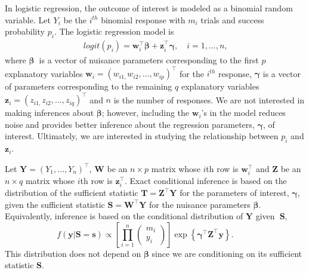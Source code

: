 \documentclass[article, shortnames]{jss}
\begin{document}
In logistic regression, the outcome of interest is modeled as a
binomial random variable. Let $Y_{i}$ be the $i^{th}$ binomial response
with $m_i$ trials and success probability $p_i$. The logistic regression
model is
\begin{equation*}
\begin{array}{l}
logit\left(
p_{i}\right) =\mathbf{w}_{i}^\top\mathbf{\beta +z}_{i}^\top\mathbf{\gamma }%
,\quad i=1,\ldots ,n\text{,}%
\end{array}%
\end{equation*}%
where $\mathbf{\beta }$\textbf{\ }is a vector of nuisance parameters
corresponding to the first $p$ explanatory variables
$\mathbf{w}_i=\left( w_{i1,}w_{i2},\ldots ,w_{ip}\right)^\top$
for the $i^{th}$ response,
$\mathbf{\gamma }$ is a vector of parameters corresponding to the
remaining $q$ explanatory variables $\mathbf{z}_i=\left(
z_{i1,}z_{i2},\ldots ,z_{iq}\right)^\top$ and $n$ is the number of
responses. We are not
interested in making inferences about $\mathbf{\beta }$; however,
including the $\mathbf{w}_{i}$'s in the model reduces noise and
provides better inference about the regression parameters,
$\mathbf{\gamma }$, of interest.
Ultimately, we are interested in
studying the relationship between $p_i$ and $\mathbf{z}_i$.

Let $\mathbf{Y}=(Y_1,\ldots,Y_n)^\top$,
$\mathbf{W}$ be an $n\times p$ matrix whose $i$th row is
$\mathbf{w}^\top_i$ and
$\mathbf{Z}$ be an $n\times q$ matrix whose $i$th row is
$\mathbf{z}^\top_i$.
Exact conditional inference is based on the distribution of the sufficient
statistic $\mathbf{T}=\mathbf{Z}^\top \mathbf{Y}$
for the parameters of interest, $\mathbf{\gamma }$,
given the sufficient statistic $\mathbf{S}=\mathbf{W}^\top\mathbf{Y}$
for the nuisance parameters $\mathbf{\beta }$.
Equivalently, inference is based on the
conditional distribution of $\mathbf{Y}$ given\textbf{\
}$\mathbf{S}$,
\begin{equation}
f\left( \mathbf{y}|\mathbf{S=s}\right) \varpropto \left[ \prod%
\limits_{i=1}^{n}%
\begin{pmatrix}
m_{i} \\
y_{i}%
\end{pmatrix}%
\right] \exp \left\{ \mathbf{\gamma }^\top\mathbf{Z}^\top\mathbf{y}\right\}
\text{.}\hspace{1cm}  \label{y given s}
\end{equation}
This distribution does not
depend on $\mathbf{\beta }$ since we are conditioning on its sufficient
statistic $\mathbf{S}$.
\end{document}
